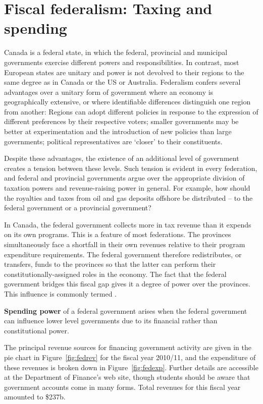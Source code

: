 \section{Fiscal federalism: Taxing and spending}\label{sec:ch14sec2}

Canada is a federal state, in which the federal, provincial and municipal
governments exercise different powers and responsibilities. In contrast,
most European states are unitary and power is not devolved to their regions
to the same degree as in Canada or the US or Australia. Federalism confers
several advantages over a unitary form of government where an economy is
geographically extensive, or where identifiable differences distinguish one
region from another: Regions can adopt different policies in response to the
expression of different preferences by their respective voters; smaller
governments may be better at experimentation and the introduction of new
policies than large governments; political representatives are `closer' to
their constituents.

Despite these advantages, the existence of an additional level of government
creates a tension between these levels. Such tension is evident in every
federation, and federal and provincial governments argue over the
appropriate division of taxation powers and revenue-raising power in
general. For example, how should the royalties and taxes from oil and gas
deposits offshore be distributed -- to the federal government or a
provincial government?

In Canada, the federal government collects more in tax revenue than it
expends on its own programs. This is a feature of most federations. The
provinces simultaneously face a shortfall in their own revenues relative to
their program expenditure requirements. The federal government therefore
redistributes, or transfers, funds to the provinces so that the latter can
perform their constitutionally-assigned roles in the economy. The fact that
the federal government bridges this fiscal gap gives it a degree of power
over the provinces. This influence is commonly termed .

\begin{DefBox}
	\textbf{Spending power} of a federal government arises when the federal government can influence lower level governments due to its financial rather than constitutional power.
\end{DefBox}

\newhtmlpage

The principal revenue sources for financing government activity are given in
the pie chart in Figure~\ref{fig:fedrev} for the fiscal year 2010/11, and
the expenditure of these revenues is broken down in Figure~\ref{fig:fedexp}.
Further details are accessible at the Department of Finance's web site,
though students should be aware that government accounts come in many forms.
Total revenues for this fiscal year amounted to \$237b.

